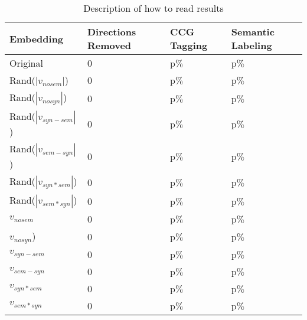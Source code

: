 \documentclass[11pt,a4paper]{article}
\begin{document}
\begin{table*}[h]
    \centering
    \begin{tabular}{llll}
    \hline
    \textbf{Embedding} & \textbf{Directions Removed} & \textbf{CCG Tagging} &\textbf{Semantic Labeling} \\
    \hline
    Original & 0 & p$\%$ & p$\%$ \\
    \hline
    Rand($|v_{nosem}|$) & 0 & p$\%$ & p$\%$ \\
    Rand($|v_{nosyn}|$) & 0 & p$\%$ & p$\%$ \\
    Rand($|v_{syn-sem}|$) & 0 & p$\%$ & p$\%$ \\
    Rand($|v_{sem-syn}|$) & 0 & p$\%$ & p$\%$ \\
    Rand($|v_{syn*sem}|$) & 0 & p$\%$ & p$\%$ \\
    Rand($|v_{sem*syn}|$) & 0 & p$\%$ & p$\%$ \\
    \hline
    $v_{nosem}$ & 0 & p$\%$ & p$\%$ \\
    $v_{nosyn}$) & 0 & p$\%$ & p$\%$ \\
    $v_{syn-sem}$ & 0 & p$\%$ & p$\%$ \\
    $v_{sem-syn}$ & 0 & p$\%$ & p$\%$ \\
    $v_{syn*sem}$ & 0 & p$\%$ & p$\%$ \\
    $v_{sem*syn}$ & 0 & p$\%$ & p$\%$ \\
    \hline
    \hline
    \end{tabular}
    \caption{\label{role description} Description of how to read results
    }
    \end{table*}
\end{document}
